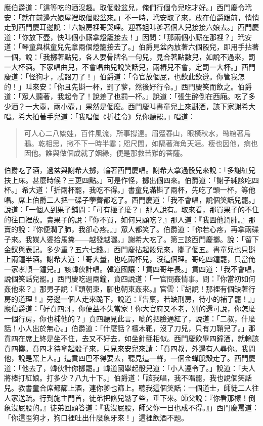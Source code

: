應伯爵道：「這等吃的酒沒趣。取個骰盆兒，俺們行個令兒吃才好。」西門慶令玳安：「就在前邊六娘屋裡取個骰盆來。」不一時，玳安取了來，放在伯爵跟前，悄悄走到西門慶耳邊說：「六娘房裡哥哭哩。迎春姐叫爹著個人兒接接六娘去。」西門慶道：「你放下壺，快叫個小廝拿燈籠接去！」因問：「那兩個小廝在那裡？」玳安道：「琴童與棋童兒先拿兩個燈籠接去了。」伯爵見盆內放著六個骰兒，即用手拈著一個，說：「我擲著點兒，各人要骨牌名一句兒，見合著點數兒，如說不過來，罰一大杯酒。下家唱曲兒，不會唱曲兒說笑話兒，兩樁兒不會，定罰一大杯。」西門慶道：「怪狗才，忒韶刀了！」伯爵道：「令官放個屁，也欽此欽遵。你管我怎的！」叫來安：「你且先斟一杯，罰了爹，然後好行令。」西門慶笑而飲之。伯爵道：「眾人聽著，我起令了！說差了也罰一杯。」說道：「張生醉倒在西廂。吃了多少酒？一大壺，兩小壺，」果然是個麼。西門慶叫書童兒上來斟酒，該下家謝希大唱。希大拍著手兒道：「我唱個《折桂令》兒你聽罷。」唱道：
\begin{quote}
可人心二八嬌娃，百件風流，所事撐達。眉蹙春山，眼橫秋水，髩綰著烏鴉。乾相思，撇不下一時半霎；咫尺間，如隔著海角天涯。瘦也因他，病也因他。誰與做個成就了姻緣，便是那救苦難的菩薩。
\end{quote}

伯爵吃了酒，過盆與謝希大擲，輪著西門慶唱。謝希大拿過骰兒來說：「多謝紅兒扶上床。甚麼時候？三更四點。」可是作怪，擲出個四來。伯爵道：「謝子純該吃四杯。」希大道：「折兩杯罷，我吃不得。」書童兒滿斟了兩杯，先吃了頭一杯，等他唱。席上伯爵二人把一碟子荸薺都吃了。西門慶道：「我不會唱，說個笑話兒罷。」說道：「一個人到果子鋪問：「可有榧子麼？」那人說有。取來看，那買果子的不住的往口裡放。賣果子的說：『你不買，如何只顧吃？』那人道：『我圖他潤肺。』那賣的說：『你便潤了肺，我卻心疼。』」眾人都笑了。伯爵道：「你若心疼，再拿兩碟子來。我媒人婆拾馬糞——越發越曬。」謝希大吃了。第三該西門慶擲。說：「留下金釵與表記。多少重？五六七錢。」西門慶拈起骰兒來，擲了個五。書童兒也只斟上兩鐘半酒。謝希大道：「哥大量，也吃兩杯兒，沒這個理。哥吃四鐘罷，只當俺一家孝順一鐘兒。」該韓伙計唱。韓道國讓：「賁四哥年長。」賁四道：「我不會唱，說個笑話兒罷。」西門慶吃過兩鐘，賁四說道：「一官問姦情事。問：『你當初如何姦他來？』那男子說：『頭朝東，腳也朝東姦來。』官雲：『胡說！那裡有個缺著行房的道理！』旁邊一個人走來跪下，說道：『告稟，若缺刑房，待小的補了罷！』」應伯爵道：「好賁四哥，你便益不失當家！你大官府又不老，別的還可說，你怎麼一個行房，你也補他的？」賁四聽見此言，唬的把臉通紅了，說道：「二叔，什麼話！小人出於無心。」伯爵道：「什麼話？檀木靶，沒了刀兒，只有刀鞘兒了。」那賁四在席上終是坐不住，去又不好去，如坐針氈相似。西門慶飲畢四鐘酒，就輪該賁四擲。賁四才待拿起骰子來，只見來安兒來請：「賁四叔，外邊有人尋你。我問他，說是窯上人。」這賁四巴不得要去，聽見這一聲，一個金蟬脫殼走了。西門慶道：「他去了，韓伙計你擲罷。」韓道國舉起骰兒道：「小人遵令了。」說道：「夫人將棒打紅娘。打多少？八九十下。」伯爵道：「該我唱，我不唱罷，我也說個笑話兒。教書童合席都篩上酒，連你爹也篩上。聽我這個笑話：一個道士，師徒二人往人家送疏。行到施主門首，徒弟把絛兒鬆了些，垂下來。師父說：『你看那樣！倒象沒屁股的。』徒弟回頭答道：『我沒屁股，師父你一日也成不得。』」西門慶罵道：「你這歪狗才，狗口裡吐出什麼象牙來！」這裡飲酒不題。

